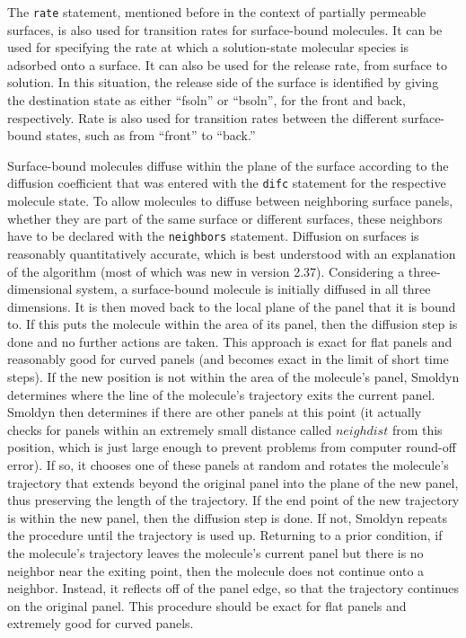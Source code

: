 \documentclass {scrbook}
\newcommand {\ttt} {\texttt}
\begin{document}
The \ttt{rate} statement, mentioned before in the context of partially permeable surfaces, is also used for transition rates for surface-bound molecules. It can be used for specifying the rate at which a solution-state molecular species is adsorbed onto a surface. It can also be used for the release rate, from surface to solution. In this situation, the release side of the surface is identified by giving the destination state as either ``fsoln'' or ``bsoln'', for the front and back, respectively. Rate is also used for transition rates between the different surface-bound states, such as from ``front'' to ``back.''

Surface-bound molecules diffuse within the plane of the surface according to the diffusion coefficient that was entered with the \ttt{difc} statement for the respective molecule state. To allow molecules to diffuse between neighboring surface panels, whether they are part of the same surface or different surfaces, these neighbors have to be declared with the \ttt{neighbors} statement. Diffusion on surfaces is reasonably quantitatively accurate, which is best understood with an explanation of the algorithm (most of which was new in version 2.37). Considering a three-dimensional system, a surface-bound molecule is initially diffused in all three dimensions. It is then moved back to the local plane of the panel that it is bound to. If this puts the molecule within the area of its panel, then the diffusion step is done and no further actions are taken. This approach is exact for flat panels and reasonably good for curved panels (and becomes exact in the limit of short time steps). If the new position is not within the area of the molecule's panel, Smoldyn determines where the line of the molecule's trajectory exits the current panel. Smoldyn then determines if there are other panels at this point (it actually checks for panels within an extremely small distance called $neighdist$ from this position, which is just large enough to prevent problems from computer round-off error). If so, it chooses one of these panels at random and rotates the molecule's trajectory that extends beyond the original panel into the plane of the new panel, thus preserving the length of the trajectory. If the end point of the new trajectory is within the new panel, then the diffusion step is done. If not, Smoldyn repeats the procedure until the trajectory is used up. Returning to a prior condition, if the molecule's trajectory leaves the molecule's current panel but there is no neighbor near the exiting point, then the molecule does not continue onto a neighbor. Instead, it reflects off of the panel edge, so that the trajectory continues on the original panel. This procedure should be exact for flat panels and extremely good for curved panels.
\end{document}
